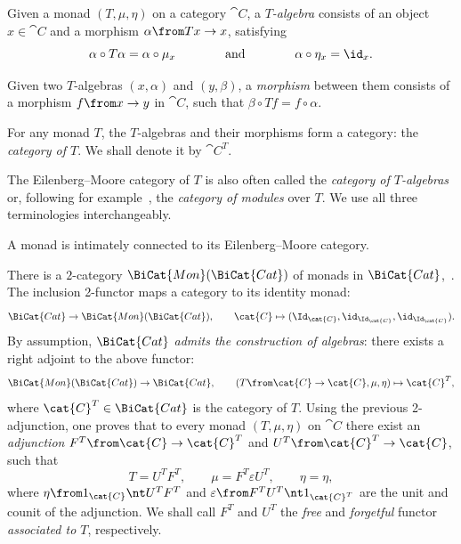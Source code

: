 \begin{definition}\label{def:algebras-over-monad}
  Given a monad \((T, \mu, \eta)\) on a category \(\cat{C}\),
  a \emph{\(T\)\hyp{}algebra} consists of an object \(x \in \cat{C}\) and a morphism \(\alpha \from Tx \to x\),
  satisfying
  \[
    \alpha \circ T\alpha = \alpha \circ \mu_x
    \qquad\qquad\text{and}\qquad\qquad
    \alpha \circ \eta_x = \id_x.
  \]

  Given two \(T\)\hyp{}algebras \((x, \alpha)\) and \((y, \beta)\),
  a \emph{morphism} between them consists of a morphism \(f\from x \to y\) in \(\cat{C}\),
  such that \(\beta \circ Tf = f \circ \alpha\).
\end{definition}

\begin{remark}\label{rmk:em-is-algebras}
  For any monad \(T\), the \(T\)\hyp{}algebras and their morphisms form a category: the \emph{\EilenbergMoore{} category of \(T\)}.%
  We shall denote it by \(\cat{C}^T\).

  The Eilenberg–Moore category of \(T\) is also often called the \emph{category of \(T\)\hyp{}algebras} or,
  following for example~\cite{Bruguieres2007},
  the \emph{category of modules} over \(T\).
  We use all three terminologies interchangeably.
\end{remark}

A monad is intimately connected to its Eilenberg–Moore category.

\begin{example}\label{ex:eilenberg-moore-adjunctions}
  There is a \(2\)\hyp{}category \(\BiCat{Mon}(\BiCat{Cat})\) of monads in \(\BiCat{Cat}\),~\cite[\S~1]{Street1972}.
  The inclusion 2-functor maps a category to its identity monad:
  \[
    \BiCat{Cat} \to \BiCat{Mon}(\BiCat{Cat}),\qquad \cat{C} \mapsto (\Id_{\cat{C}}, \id_{\Id_{\cat{C}}}, \id_{\Id_{\cat{C}}}).
  \]
  By assumption, \(\BiCat{Cat}\) \emph{admits the construction of algebras}:
  there exists a right adjoint to the above functor:
  \[
    \BiCat{Mon}(\BiCat{Cat}) \to \BiCat{Cat},
    \qquad
    (T\from \cat{C}\to \cat{C}, \mu, \eta) \mapsto \cat{C}^{T},
  \]
  where \(\cat{C}^{T} \in \BiCat{Cat}\) is the \EilenbergMoore{} category of \(T\).
  Using the previous 2-adjunction,
  one proves that to every monad \((T, \mu, \eta)\) on \(\cat{C}\)
  there exist an \emph{\EilenbergMoore{} adjunction}
  \(F^T \from \cat{C} \to \cat{C}^T\)
  and
  \(U^T \from \cat{C}^T \to \cat{C}\),
  such that
  \[
    T = U^T F^T,\qquad
    \mu = F^T \varepsilon U^T,\qquad
    \eta = \eta,
  \]
  where
  \(\eta \from 1_{\cat{C}} \nt U^T F^T\) and \(\varepsilon \from F^T U^T \nt 1_{\cat{C}^T}\)
  are the unit and counit of the \EilenbergMoore{} adjunction.
  We shall call \(F^T\) and \(U^T\) the \emph{free} and \emph{forgetful} functor \emph{associated to \(T\)}, respectively.
\end{example}

